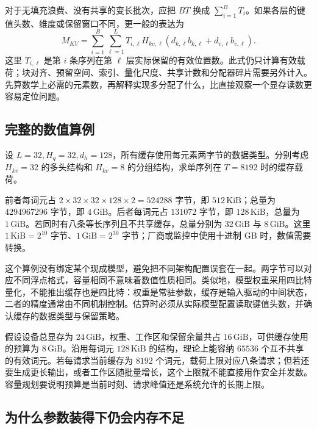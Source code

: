 \documentclass[UTF8,12pt,a4paper,fontset=fandol]{ctexart}
\begin{document}
对于无填充浪费、没有共享的变长批次，应把 $BT$ 换成 $\sum_{i=1}^{B}T_i$。如果各层的键值头数、维度或保留窗口不同，更一般的表达为
\begin{equation}
 M_{KV}=\sum_{i=1}^{B}\sum_{\ell=1}^{L}
 T_{i,\ell}H_{kv,\ell}
 (d_{k,\ell}b_{k,\ell}+d_{v,\ell}b_{v,\ell}).
 \label{eq:kv-memory-heterogeneous}
\end{equation}
这里 $T_{i,\ell}$ 是第 $i$ 条序列在第 $\ell$ 层实际保留的有效位置数。此式仍只计算有效载荷；块对齐、预留空间、索引、量化尺度、共享计数和分配器碎片需要另外计入。先算数学上必需的元素数，再解释实现多分配了什么，比直接观察一个显存读数更容易定位问题。

\subsection{完整的数值算例}

\begin{example}[同一宽度下的缓存规模]
设 $L=32,H_q=32,d_h=128$，所有缓存使用每元素两字节的数据类型。分别考虑 $H_{kv}=32$ 的多头结构和 $H_{kv}=8$ 的分组结构，求单序列在 $T=8192$ 时的缓存载荷。
\end{example}
\begin{solve}
前者每词元占 $2\times32\times32\times128\times2=524288$ 字节，即 $512\,\mathrm{KiB}$；总量为 $4294967296$ 字节，即 $4\,\mathrm{GiB}$。后者每词元占 $131072$ 字节，即 $128\,\mathrm{KiB}$，总量为 $1\,\mathrm{GiB}$。若同时有八条等长序列且不共享缓存，总量分别为 $32\,\mathrm{GiB}$ 与 $8\,\mathrm{GiB}$。这里 $1\,\mathrm{KiB}=2^{10}$ 字节、$1\,\mathrm{GiB}=2^{30}$ 字节；厂商或监控中使用十进制 GB 时，数值需要转换。
\end{solve}

这个算例没有绑定某个现成模型，避免把不同架构配置误套在一起。两字节可以对应不同浮点格式，容量相同不意味着数值性质相同。类似地，模型权重采用四比特量化，不能推出缓存也是四比特：权重是常驻参数，缓存是输入驱动的中间状态，二者的精度通常由不同机制控制。估算时必须从实际模型配置读取键值头数，并确认缓存的数据类型与保留策略。

假设设备总显存为 $24\,\mathrm{GiB}$，权重、工作区和保留余量共占 $16\,\mathrm{GiB}$，可供缓存使用的预算为 $8\,\mathrm{GiB}$。沿用每词元 $128\,\mathrm{KiB}$ 的结构，理论上能容纳 $65536$ 个互不共享的有效词元。若每请求当前缓存为 $8192$ 个词元，载荷上限对应八条请求；但若还要生成更长输出，或者工作区随批量增长，这个上限就不能直接用作安全并发数。容量规划要说明预算是当前时刻、请求峰值还是系统允许的长期上限。

\subsection{为什么参数装得下仍会内存不足}
\end{document}
